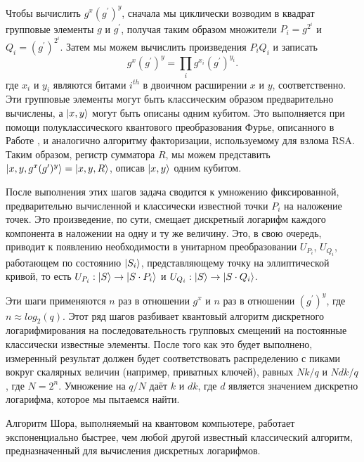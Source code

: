 \documentclass{mrl}
\begin{document}
Чтобы вычислить $g^x(g^\prime)^y$, сначала мы циклически возводим в квадрат групповые элементы $g$ и $g^\prime$, получая таким образом множители $P_i = g^{2^i}$ и $Q_i = (g^\prime)^{2^i}$. Затем мы можем вычислить произведения $P_i Q_i$ и записать
\begin{equation}
    g^x(g^\prime)^y = \prod_i g^{x_i}(g^{\prime})^{y_i}.
\end{equation}
где $x_i$ и $y_i$ являются битами $i^{th}$ в двоичном расширении $x$ и $y$, соответственно. Эти групповые элементы могут быть классическим образом предварительно вычислены, а $\ket{x,y}$ могут быть описаны одним кубитом. Это выполняется при помощи полуклассического квантового преобразования Фурье, описанного в Работе \cite{cleve1998quantum}, и аналогично алгоритму факторизации, используемому для взлома RSA. Таким образом, регистр сумматора $R$, мы можем представить $\ket{x,y,g^x(g^\prime)^y} = \ket{x,y,R}$, описав $\ket{x,y}$ одним кубитом.

После выполнения этих шагов задача сводится к умножению фиксированной, предварительно вычисленной и классически известной точки $P_i$ на наложение точек. Это произведение, по сути, смещает дискретный логарифм каждого компонента в наложении на одну и ту же величину. Это, в свою очередь, приводит к появлению необходимости в унитарном преобразовании $U_{P_i}$, $U_{Q_i}$, работающем по состоянию $\ket{S_i}$, представляющему точку на эллиптической кривой, то есть $U_{P_i} : \ket{S} \rightarrow \ket{S \cdot P_i}$ и $U_{Q_i} : \ket{S} \rightarrow \ket{S \cdot Q_i}$.

Эти шаги применяются $n$ раз в отношении $g^x$ и $n$ раз в отношении $(g^\prime)^y$, где $n \approx log_2(q)$. Этот ряд шагов разбивает квантовый алгоритм дискретного логарифмирования на последовательность групповых смещений на постоянные классически известные элементы. После того как это будет выполнено, измеренный результат должен будет соответствовать распределению с пиками вокруг скалярных величин (например, приватных ключей), равных $Nk/q$ и $Ndk/q$, где $N = 2^n$. Умножение на $q/N$ даёт $k$ и $dk$, где $d$ является значением дискретно логарифма, которое мы пытаемся найти.

Алгоритм Шора, выполняемый на квантовом компьютере, работает экспоненциально быстрее, чем любой другой известный классический алгоритм, предназначенный для вычисления дискретных логарифмов. 
\end{document}
